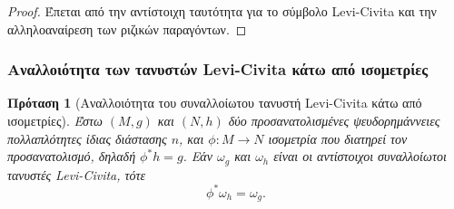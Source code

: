 \documentclass[11pt,a4paper,twoside,openright]{book}
\newtheorem{proposition}[lemma]{Πρόταση}
\begin{document}
\begin{proof}
Έπεται από την αντίστοιχη ταυτότητα για το σύμβολο Levi-Civita και την αλληλοαναίρεση των ριζικών παραγόντων.
\end{proof}

\subsubsection{Αναλλοιότητα των τανυστών Levi-Civita κάτω από ισομετρίες}
	\label{sec:invariance-levi-civita-isometries}

\begin{proposition}[Αναλλοιότητα του συναλλοίωτου τανυστή Levi-Civita κάτω από ισομετρίες]
	\label{prop:invariance-covariant-levi-civita-isometries}
Έστω $(M, g)$ και $(N, h)$ δύο προσανατολισμένες ψευδορημάννειες πολλαπλότητες ίδιας διάστασης $n$, και $\phi: M \to N$ ισομετρία που διατηρεί τον προσανατολισμό, δηλαδή $\phi^* h = g$. Εάν $\omega_g$ και $\omega_h$ είναι οι αντίστοιχοι συναλλοίωτοι τανυστές Levi-Civita, τότε
\begin{equation}
\phi^* \omega_h = \omega_g.
\end{equation}
\end{proposition}
\end{document}
